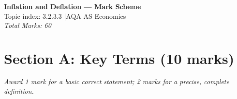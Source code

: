 \documentclass[12pt,a4paper]{article}
\begin{document}
\begin{center}
    \Large\textbf{Inflation and Deflation --- Mark Scheme}\\[5pt]
    \normalsize Topic index: 3.2.3.3 \quad|\quad AQA AS Economics\\[3pt]
    \textit{Total Marks: 60}
\end{center}

\vspace{1em}

\section*{Section A: Key Terms (10 marks)}

\textit{Award 1 mark for a basic correct statement; 2 marks for a precise, complete definition.}

\vspace{0.5em}
\end{document}

